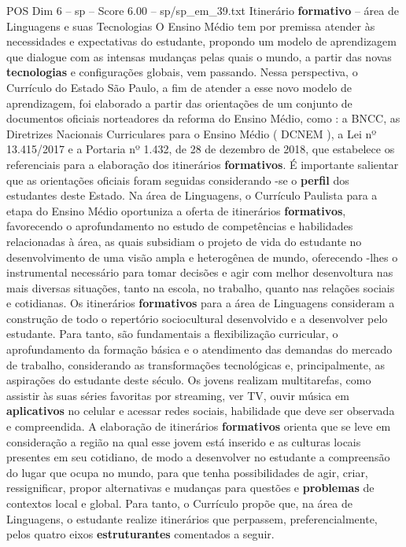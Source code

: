 \begin{textsample}{POS Dim 6 – sp – Score 6.00 – sp/sp\_em\_39.txt}  \label{ex:f6_pos_089}
Itinerário \textbf{formativo} – área de Linguagens e suas Tecnologias O Ensino Médio tem por premissa atender às necessidades e expectativas do estudante, propondo um modelo de aprendizagem que dialogue com as intensas mudanças pelas quais o mundo, a partir das novas \textbf{tecnologias} e configurações globais, vem passando.
Nessa perspectiva, o Currículo do Estado São Paulo, a fim de atender a esse novo modelo de aprendizagem, foi elaborado a partir das orientações de um conjunto de documentos oficiais norteadores da reforma do Ensino Médio, como : a BNCC, as Diretrizes Nacionais Curriculares para o Ensino Médio ( DCNEM ), a Lei nº 13.415/2017 e a Portaria nº 1.432, de 28 de dezembro de 2018, que estabelece os referenciais para a elaboração dos itinerários \textbf{formativos}.
É importante salientar que as orientações oficiais foram seguidas considerando -se o \textbf{perfil} dos estudantes deste Estado.
Na área de Linguagens, o Currículo Paulista para a etapa do Ensino Médio oportuniza a oferta de itinerários \textbf{formativos}, favorecendo o aprofundamento no estudo de competências e habilidades relacionadas à área, as quais subsidiam o projeto de vida do estudante no desenvolvimento de uma visão ampla e heterogênea de mundo, oferecendo -lhes o instrumental necessário para tomar decisões e agir com melhor desenvoltura nas mais diversas situações, tanto na escola, no trabalho, quanto nas relações sociais e cotidianas.
Os itinerários \textbf{formativos} para a área de Linguagens consideram a construção de todo o repertório sociocultural desenvolvido e a desenvolver pelo estudante.
Para tanto, são fundamentais a flexibilização curricular, o aprofundamento da formação básica e o atendimento das demandas do mercado de trabalho, considerando as transformações tecnológicas e, principalmente, as aspirações do estudante deste século.
Os jovens realizam multitarefas, como assistir às suas séries favoritas por streaming, ver TV, ouvir música em \textbf{aplicativos} no celular e acessar redes sociais, habilidade que deve ser observada e compreendida.
A elaboração de itinerários \textbf{formativos} orienta que se leve em consideração a região na qual esse jovem está inserido e as culturas locais presentes em seu cotidiano, de modo a desenvolver no estudante a compreensão do lugar que ocupa no mundo, para que tenha possibilidades de agir, criar, ressignificar, propor alternativas e mudanças para questões e \textbf{problemas} de contextos local e global.
Para tanto, o Currículo propõe que, na área de Linguagens, o estudante realize itinerários que perpassem, preferencialmente, pelos quatro eixos \textbf{estruturantes} comentados a seguir.

\end{textsample}

